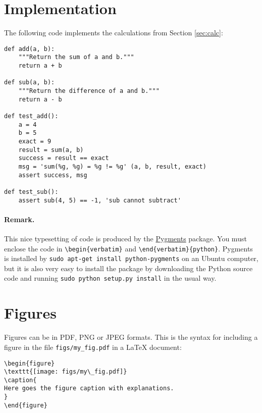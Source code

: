 \documentclass{article}
\begin{document}
\section{Implementation}
\label{sec:py}

The following code implements the calculations from Section \ref{sec:calc}:

\begin{verbatim}
def add(a, b):
    """Return the sum of a and b."""
    return a + b

def sub(a, b):
    """Return the difference of a and b."""
    return a - b

def test_add():
    a = 4
    b = 5
    exact = 9
    result = sum(a, b)
    success = result == exact
    msg = 'sum(%g, %g) = %g != %g' (a, b, result, exact)
    assert success, msg

def test_sub():
    assert sub(4, 5) == -1, 'sub cannot subtract'
\end{verbatim}

\paragraph{Remark.}
This nice typesetting of code is produced by the
\href{http://pygments.org/}{Pygments} package. You must
enclose the code in
\verb!\begin{verbatim}! and
\verb!\end{verbatim}{python}!. Pygments is installed by
\verb!sudo apt-get install python-pygments!
on an Ubuntu computer, but it is also very
easy to install the package by downloading the Python source
code and running \verb!sudo python setup.py install! in the usual way.

\section{Figures}

Figures can be in PDF, PNG or JPEG formats. This is the syntax for
including a figure in the file \verb!figs/my_fig.pdf! in a \LaTeX{}
document:

\begin{verbatim}
\begin{figure}
\texttt{[image: figs/my\_fig.pdf]}
\caption{
Here goes the figure caption with explanations.
}
\end{figure}
\end{verbatim}
\end{document}
